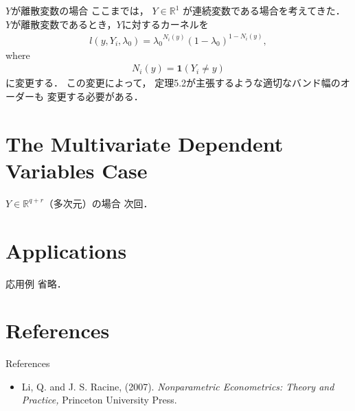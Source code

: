 \documentclass[xcolor=svgnames,dvipdfmx,cjk]{beamer}
\theoremstyle{example}
\begin{document}
\begin{frame}{$Y$が離散変数の場合}
  \quad 
  ここまでは，
  $Y \in \mathbb{R}^1$
  が連続変数である場合を考えてきた．
  $Y$が離散変数であるとき，$Y$に対するカーネルを
  \begin{align*}
    l(y, Y_i, \lambda_0) = {\lambda_0}^{N_{i}(y)} (1-\lambda_0)^{1-N_{i}(y)} ,
  \end{align*}
  where
  \begin{align*}
    N_{i}(y) = \mathbf{1}(Y_i \neq y)
  \end{align*}
  に変更する．
  この変更によって，
  定理5.2が主張するような適切なバンド幅のオーダーも
  変更する必要がある．
\end{frame}



\section{The Multivariate Dependent Variables Case}

\begin{frame}{$Y \in \mathbb{R}^{q+r}$（多次元）の場合}
  次回．
\end{frame}


\section{Applications}

\begin{frame}{応用例}
  省略．
\end{frame}


\section{References}

\begin{frame}{References}
  \begin{itemize}
    \item Li, Q. and J. S. Racine, (2007). 
          \textit{Nonparametric Econometrics: Theory and Practice,} 
          Princeton University Press.
  \end{itemize}
\end{frame}
\end{document}
